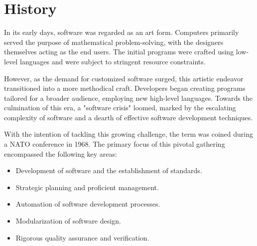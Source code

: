 \section{History}

In its early days, software was regarded as an art form. 
Computers primarily served the purpose of mathematical problem-solving, with the designers themselves acting as the end users. 
The initial programs were crafted using low-level languages and were subject to stringent resource constraints.

However, as the demand for customized software surged, this artistic endeavor transitioned into a more methodical craft. 
Developers began creating programs tailored for a broader audience, employing new high-level languages.
Towards the culmination of this era, a "software crisis" loomed, marked by the escalating complexity of software and a dearth of effective software development techniques.

With the intention of tackling this growing challenge, the term was coined during a NATO conference in 1968. 
The primary focus of this pivotal gathering encompassed the following key areas:
\begin{itemize}
    \item Development of software and the establishment of standards.
    \item Strategic planning and proficient management.
    \item Automation of software development processes.
    \item Modularization of software design.
    \item Rigorous quality assurance and verification.
\end{itemize}
